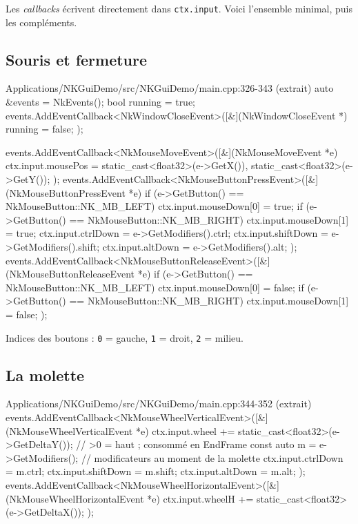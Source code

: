 Les \emph{callbacks} écrivent directement dans \texttt{ctx.input}. Voici
l'ensemble minimal, puis les compléments.

\subsection{Souris et fermeture}

\begin{nkcode}{Applications/NKGuiDemo/src/NKGuiDemo/main.cpp:326-343 (extrait)}
    auto &events = NkEvents();
    bool running = true;
    events.AddEventCallback<NkWindowCloseEvent>([&](NkWindowCloseEvent *) { running = false; });

    events.AddEventCallback<NkMouseMoveEvent>([&](NkMouseMoveEvent *e) {
        ctx.input.mousePos = {static_cast<float32>(e->GetX()), static_cast<float32>(e->GetY())};
    });
    events.AddEventCallback<NkMouseButtonPressEvent>([&](NkMouseButtonPressEvent *e) {
        if (e->GetButton() == NkMouseButton::NK_MB_LEFT)  ctx.input.mouseDown[0] = true;
        if (e->GetButton() == NkMouseButton::NK_MB_RIGHT) ctx.input.mouseDown[1] = true;
        ctx.input.ctrlDown  = e->GetModifiers().ctrl;
        ctx.input.shiftDown = e->GetModifiers().shift;
        ctx.input.altDown   = e->GetModifiers().alt;
    });
    events.AddEventCallback<NkMouseButtonReleaseEvent>([&](NkMouseButtonReleaseEvent *e) {
        if (e->GetButton() == NkMouseButton::NK_MB_LEFT)  ctx.input.mouseDown[0] = false;
        if (e->GetButton() == NkMouseButton::NK_MB_RIGHT) ctx.input.mouseDown[1] = false;
    });
\end{nkcode}

Indices des boutons : \texttt{0} = gauche, \texttt{1} = droit, \texttt{2} =
milieu.

\subsection{La molette}

\begin{nkcode}{Applications/NKGuiDemo/src/NKGuiDemo/main.cpp:344-352 (extrait)}
    events.AddEventCallback<NkMouseWheelVerticalEvent>([&](NkMouseWheelVerticalEvent *e) {
        ctx.input.wheel += static_cast<float32>(e->GetDeltaY()); // >0 = haut ; consommé en EndFrame
        const auto m = e->GetModifiers();                        // modificateurs au moment de la molette
        ctx.input.ctrlDown = m.ctrl; ctx.input.shiftDown = m.shift; ctx.input.altDown = m.alt;
    });
    events.AddEventCallback<NkMouseWheelHorizontalEvent>([&](NkMouseWheelHorizontalEvent *e) {
        ctx.input.wheelH += static_cast<float32>(e->GetDeltaX());
    });
\end{nkcode}

